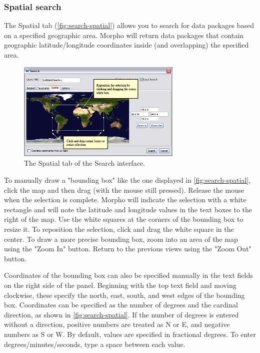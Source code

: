 \subsubsection[Spatial]{Spatial search} \label{sec:search-spatial}

The Spatial tab (\autoref{fig:search-spatial}) allows you to search for data packages
based on a specified geographic area. Morpho will return data packages
that contain geographic latitude/longitude coordinates inside (and
overlapping) the specified area.

\begin{figure}
  \centering
    \includegraphics[width=0.7\textwidth]{images/search-spatial.jpg}
  \caption{The Spatial tab of the Search interface.}
  \label{fig:search-spatial}
\end{figure}

To manually draw a "bounding box" like the one displayed in
\autoref{fig:search-spatial}, click the map and then drag (with the
mouse still pressed). Release the mouse when the selection is complete.
Morpho will indicate the selection with a white rectangle and will note
the latitude and longitude values in the text boxes to the right of the
map. Use the white squares at the corners of the bounding box to resize
it. To reposition the selection, click and drag the white square in the
center.  To draw a more precise bounding box, zoom into an area of the
map using the "Zoom In" button. Return to the previous views using the
"Zoom Out" button. 

Coordinates of the bounding box can also be specified manually in the
text fields on the right side of the panel. Beginning with the top text
field and moving clockwise, these specify the north, east, south, and
west edges of the bounding box. Coordinates can be specified as the
number of degrees and the cardinal direction, as shown in
\autoref{fig:search-spatial}. If the number of degrees is entered
without a direction, positive numbers are treated as N or E, and
negative numbers as S or W. By default, values are specified in
fractional degrees. To enter degrees/minutes/seconds, type a space
between each value.

